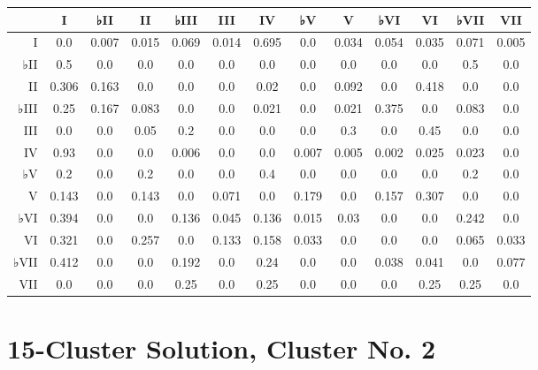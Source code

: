 \begin{table}[htbp]
\begin{minipage}{\linewidth}
\setlength{\tymax}{0.5\linewidth}
\centering
\small
\begin{tabulary}{\textwidth}{@{}RCCCCCCCCCCCC@{}} \toprule
&I&♭II&II&♭III&III&IV&♭V&V&♭VI&VI&♭VII&VII\\
\midrule
I&0.0&0.007&0.015&0.069&0.014&0.695&0.0&0.034&0.054&0.035&0.071&0.005\\
♭II&0.5&0.0&0.0&0.0&0.0&0.0&0.0&0.0&0.0&0.0&0.5&0.0\\
II&0.306&0.163&0.0&0.0&0.0&0.02&0.0&0.092&0.0&0.418&0.0&0.0\\
♭III&0.25&0.167&0.083&0.0&0.0&0.021&0.0&0.021&0.375&0.0&0.083&0.0\\
III&0.0&0.0&0.05&0.2&0.0&0.0&0.0&0.3&0.0&0.45&0.0&0.0\\
IV&0.93&0.0&0.0&0.006&0.0&0.0&0.007&0.005&0.002&0.025&0.023&0.0\\
♭V&0.2&0.0&0.2&0.0&0.0&0.4&0.0&0.0&0.0&0.0&0.2&0.0\\
V&0.143&0.0&0.143&0.0&0.071&0.0&0.179&0.0&0.157&0.307&0.0&0.0\\
♭VI&0.394&0.0&0.0&0.136&0.045&0.136&0.015&0.03&0.0&0.0&0.242&0.0\\
VI&0.321&0.0&0.257&0.0&0.133&0.158&0.033&0.0&0.0&0.0&0.065&0.033\\
♭VII&0.412&0.0&0.0&0.192&0.0&0.24&0.0&0.0&0.038&0.041&0.0&0.077\\
VII&0.0&0.0&0.0&0.25&0.0&0.25&0.0&0.0&0.0&0.25&0.25&0.0\\

\bottomrule

\end{tabulary}
\end{minipage}
\end{table}

\section{15-Cluster Solution, Cluster No. 2}
\label{15-clustersolutionclusterno.2}

